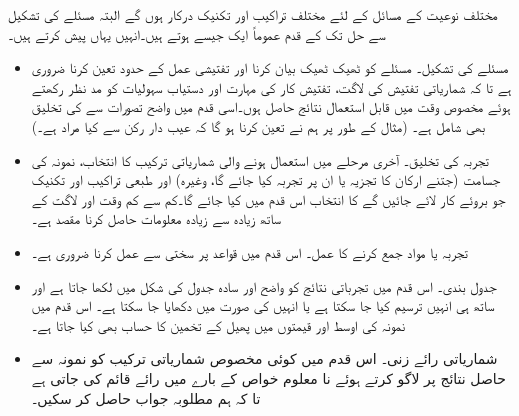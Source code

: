مختلف نوعیت کے مسائل کے لئے مختلف تراکیب اور تکنیک  درکار ہوں گے البتہ مسئلے کی تشکیل سے حل تک کے قدم عموماً ایک جیسے ہوتے ہیں۔انہیں یہاں پیش کرتے ہیں۔
\begin{itemize}
\item{مسئلے کی تشکیل۔}
مسئلے کو ٹھیک ٹھیک بیان کرنا اور تفتیشی عمل کے حدود تعین کرنا ضروری ہے تا کہ شماریاتی تفتیش کی لاگت، تفتیش کار کی مہارت اور دستیاب سہولیات کو مد نظر رکھتے ہوئے مخصوص  وقت میں قابل استعمال نتائج حاصل ہوں۔اسی قدم میں واضح تصورات سے   کی تخلیق بھی شامل ہے۔ (مثال کے طور پر ہم نے تعین کرنا ہو گا کہ عیب دار رکن سے کیا مراد ہے۔)
\item{تجربہ کی تخلیق۔}
آخری مرحلے میں استعمال ہونے والی شماریاتی ترکیب کا انتخاب، نمونہ کی جسامت (جتنے ارکان کا تجزیہ  یا ان پر تجربہ کیا جائے گا، وغیرہ) اور طبعی تراکیب اور تکنیک جو بروئے کار لائے جائیں گے کا انتخاب اس قدم میں کیا جائے گا۔کم سے کم وقت اور لاگت کے ساتھ زیادہ سے زیادہ معلومات حاصل کرنا مقصد ہے۔
\item{تجربہ یا مواد جمع کرنے کا عمل۔}
اس قدم میں قواعد پر سختی سے عمل کرنا ضروری ہے۔
\item{جدول بندی۔}
اس قدم میں تجرباتی نتائج کو واضح اور سادہ جدول کی شکل میں لکھا جاتا ہے اور ساتھ ہی انہیں ترسیم کیا جا سکتا ہے یا انہیں  کی صورت میں دکھایا جا سکتا ہے۔ اس قدم میں نمونہ کی اوسط اور قیمتوں میں پھیل کے تخمین کا حساب بھی کیا جاتا ہے۔
\item{شماریاتی رائے زنی۔}
اس قدم میں کوئی مخصوص شماریاتی ترکیب کو نمونہ سے حاصل  نتائج پر لاگو کرتے ہوئے نا معلوم خواص کے بارے میں رائے قائم کی جاتی ہے تا کہ ہم مطلوبہ جواب حاصل کر سکیں۔  
\end{itemize}

